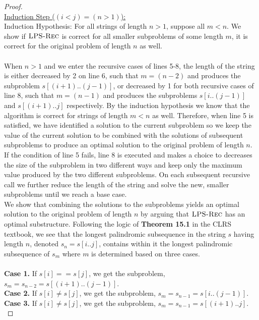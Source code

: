 \documentclass[11pt]{article}
\theoremstyle{nonumberplain}
\newtheorem{proof}{Proof}
\begin{document}
\begin{enumerate}
\begin{proof}
  \\
  \ul{Induction Step ($(i<j)=(n>1)$):}\\
  Induction Hypothesis: For all strings of length $n>1$, suppose all $m<n$. We show if $\textnormal{\scshape LPS-Rec}$ is correct for all smaller subproblems of some length $m$, it is correct for the original problem of length $n$ as well.\\
  \\
  When $n>1$ and we enter the recursive cases of lines 5-8, the length of the string is either decreased by 2 on line 6, such that $m=(n-2)$ and produces the subproblem $s[(i+1)..(j-1)]$, or decreased by 1 for both recursive cases of line 8, such that $m=(n-1)$ and produces the subproblems $s[i..(j-1)]$ and $s[(i+1)..j]$ respectively. By the induction hypothesis we know that the algorithm is correct for strings of length $m<n$ as well. Therefore, when line 5 is satisfied, we have identified a solution to the current subproblem so we keep the value of the current solution to be combined with the solutions of subsequent subproblems to produce an optimal solution to the original problem of length $n$. %
  If the condition of line 5 fails, line 8 is executed and makes a choice to decreases the size of the subproblem in two different ways and keep only the maximum value produced by the two different subproblems. On each subsequent recursive call we further reduce the length of the string and solve the new, smaller subproblems until we reach a base case. \\
  We show that combining the solutions to the subproblems yields an optimal solution to the original problem of length $n$ by arguing that $\textnormal{\scshape LPS-Rec}$ has an optimal substructure. Following the logic of \textbf{Theorem 15.1} in the CLRS textbook, we see that the longest palindromic subsequence in the string $s$ having length $n$, denoted $s_n=s[i..j]$, contains within it the longest palindromic subsequence of $s_m$ where $m$ is determined based on three cases. \\
  \\
  \textbf{Case 1.} If $s[i]==s[j]$, we get the subproblem, $s_m=s_{n-2}=s[(i+1)..(j-1)]$.\\
  \textbf{Case 2.} If $s[i] \neq s[j]$, we get the subproblem, $s_m=s_{n-1}=s[i..(j-1)]$.\\
  \textbf{Case 3.} If $s[i] \neq s[j]$, we get the subproblem, $s_m=s_{n-1}=s[(i+1)..j]$.\\

\end{proof}
\end{enumerate}
\end{document}
